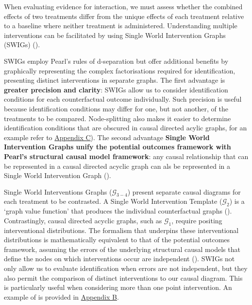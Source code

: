 \documentclass[
  single column]{article}
\begin{document}
When evaluating evidence for interaction, we must assess whether the
combined effects of two treatments differ from the unique effects of
each treatment relative to a baseline where neither treatment is
administered. Understanding multiple interventions can be facilitated by
using Single World Intervention Graphs (SWIGs)
().

SWIGs employ Pearl's rules of d-separation but offer additional benefits
by graphically representing the complex factorisations required for
identification, presenting distinct interventions in separate graphs.
The first advantage is \textbf{greater precision and clarity}: SWIGs
allow us to consider identification conditions for each counterfactual
outcome individually. Such precision is useful because identification
conditions may differ for one, but not another, of the treatments to be
compared. Node-splitting also makes it easier to determine
identification conditions that are obscured in causal directed acylic
graphs, for an example refer to \hyperref[id-app-c]{Appendix C}). The
second advantage \textbf{Single World Intervention Graphs unify the
potential outcomes framework with Pearl's structural causal model
framework}: any causal relationship that can be represented in a causal
directed acyclic graph can als be represented in a Single World
Intervention Graph ().

\begin{table}

\caption{\label{tbl-swigtable}Single World Interventions Graphs
(\(\mathcal{G}_{3-4}\)) present separate causal diagrams for each
treatment to be contrasted. A Single World Intervention Template
(\(\mathcal{G}_{2}\)) is a `graph value function' that produces the
individual counterfactual graphs
().
Contrastingly, causal directed acyclic graphs, such as
\(\mathcal{G}_1\), require positing interventional distributions. The
formalism that underpins these interventional distributions is
mathematically equivalent to that of the potential outcomes framework,
assuming the errors of the underlying structural causal models that
define the nodes on which interventions occur are independent
(). SWIGs not
only allow us to evaluate identification when errors are not
independent, but they also permit the comparison of distinct
interventions to our causal diagram. This is particularly useful when
considering more than one point intervention. An example of is provided
in \hyperref[id-app-b]{Appendix B}.}

\centering{

\swigtable

}

\end{table}%
\end{document}
